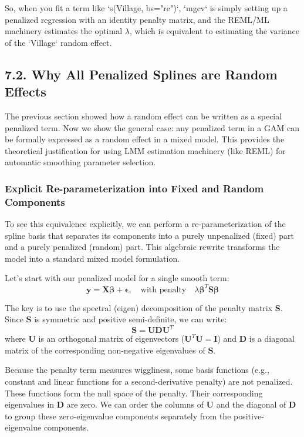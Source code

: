 \documentclass[11pt, a4paper]{article}
\begin{document}
So, when you fit a term like `s(Village, bs="re")`, `mgcv` is simply setting up a penalized regression with an identity penalty matrix, and the REML/ML machinery estimates the optimal $\lambda$, which is equivalent to estimating the variance of the `Village` random effect.

\subsection{7.2. Why All Penalized Splines are Random Effects}
The previous section showed how a random effect can be written as a special penalized term. Now we show the general case: any penalized term in a GAM can be formally expressed as a random effect in a mixed model. This provides the theoretical justification for using LMM estimation machinery (like REML) for automatic smoothing parameter selection.

\subsubsection{Explicit Re-parameterization into Fixed and Random Components}
To see this equivalence explicitly, we can perform a re-parameterization of the spline basis that separates its components into a purely unpenalized (fixed) part and a purely penalized (random) part. This algebraic rewrite transforms the model into a standard mixed model formulation.

Let's start with our penalized model for a single smooth term:
\begin{equation*}
    \mathbf{y} = \mathbf{X}\boldsymbol{\beta} + \boldsymbol{\epsilon}, \quad \text{with penalty} \quad \lambda \boldsymbol{\beta}^T \mathbf{S} \boldsymbol{\beta}
\end{equation*}

The key is to use the spectral (eigen) decomposition of the penalty matrix $\mathbf{S}$. Since $\mathbf{S}$ is symmetric and positive semi-definite, we can write:
\begin{equation*}
    \mathbf{S} = \mathbf{U}\mathbf{D}\mathbf{U}^T
\end{equation*}
where $\mathbf{U}$ is an orthogonal matrix of eigenvectors ($\mathbf{U}^T\mathbf{U} = \mathbf{I}$) and $\mathbf{D}$ is a diagonal matrix of the corresponding non-negative eigenvalues of $\mathbf{S}$.

Because the penalty term measures wiggliness, some basis functions (e.g., constant and linear functions for a second-derivative penalty) are not penalized. These functions form the null space of the penalty. Their corresponding eigenvalues in $\mathbf{D}$ are zero. We can order the columns of $\mathbf{U}$ and the diagonal of $\mathbf{D}$ to group these zero-eigenvalue components separately from the positive-eigenvalue components.
\end{document}
